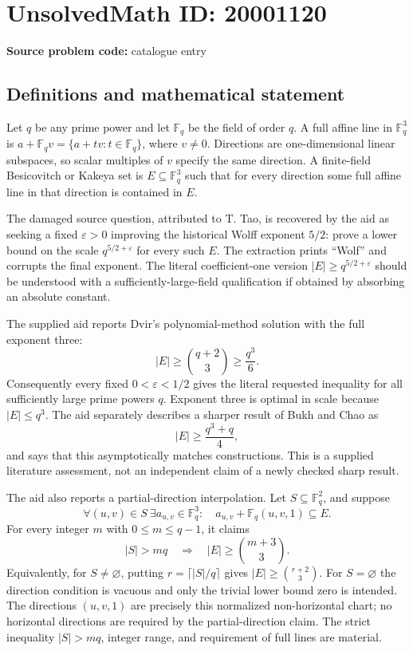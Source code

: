 \documentclass[11pt]{article}
\newcommand{\F}{\mathbb{F}}
\begin{document}
\section*{UnsolvedMath ID: 20001120}
\textbf{Source problem code:} catalogue entry
\subsection{Definitions and mathematical statement}
Let \(q\) be any prime power and let \(\F_q\) be the field of order \(q\). A full affine line in \(\F_q^3\) is \(a+\F_q v=\{a+tv:t\in\F_q\}\), where \(v\ne0\). Directions are one-dimensional linear subspaces, so scalar multiples of \(v\) specify the same direction. A finite-field Besicovitch or Kakeya set is \(E\subseteq\F_q^3\) such that for every direction some full affine line in that direction is contained in \(E\).

The damaged source question, attributed to T. Tao, is recovered by the aid as seeking a fixed \(\varepsilon>0\) improving the historical Wolff exponent \(5/2\): prove a lower bound on the scale \(q^{5/2+\varepsilon}\) for every such \(E\). The extraction prints ``Wolf'' and corrupts the final exponent. The literal coefficient-one version \(|E|\geq q^{5/2+\varepsilon}\) should be understood with a sufficiently-large-field qualification if obtained by absorbing an absolute constant.

The supplied aid reports Dvir's polynomial-method solution with the full exponent three:
\[
 |E|\geq\binom{q+2}{3}\geq\frac{q^3}{6}.
\]
Consequently every fixed \(0<\varepsilon<1/2\) gives the literal requested inequality for all sufficiently large prime powers \(q\). Exponent three is optimal in scale because \(|E|\leq q^3\). The aid separately describes a sharper result of Bukh and Chao as
\[
 |E|\geq\frac{q^3+q}{4},
\]
and says that this asymptotically matches constructions. This is a supplied literature assessment, not an independent claim of a newly checked sharp result.

The aid also reports a partial-direction interpolation. Let \(S\subseteq\F_q^2\), and suppose
\[
 \forall(u,v)\in S\ \exists a_{u,v}\in\F_q^3:\quad
 a_{u,v}+\F_q(u,v,1)\subseteq E.
\]
For every integer \(m\) with \(0\leq m\leq q-1\), it claims
\[
 |S|>mq\quad\Longrightarrow\quad |E|\geq\binom{m+3}{3}.
\]
Equivalently, for \(S\ne\varnothing\), putting \(r=\lceil|S|/q\rceil\) gives \(|E|\geq\binom{r+2}{3}\). For \(S=\varnothing\) the direction condition is vacuous and only the trivial lower bound zero is intended. The directions \((u,v,1)\) are precisely this normalized non-horizontal chart; no horizontal directions are required by the partial-direction claim. The strict inequality \(|S|>mq\), integer range, and requirement of full lines are material.
\end{document}
